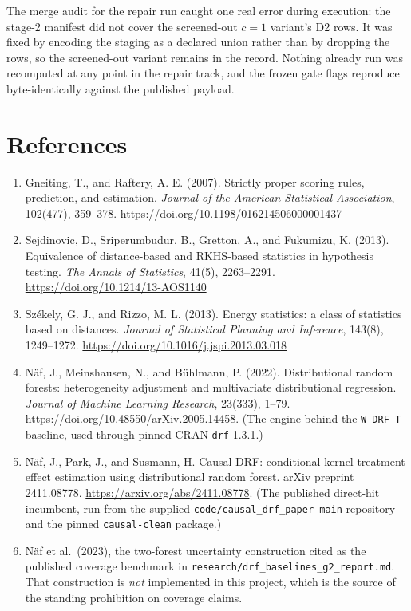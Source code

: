 \documentclass[11pt,a4paper]{article}
\theoremstyle{definition}
\theoremstyle{remark}
\begin{document}
The merge audit for the repair run caught one real error during execution: the
stage-2 manifest did not cover the screened-out $c=1$ variant's D2 rows. It was
fixed by encoding the staging as a declared union rather than by dropping the
rows, so the screened-out variant remains in the record. Nothing already run was
recomputed at any point in the repair track, and the frozen gate flags reproduce
byte-identically against the published payload.

\section*{References}

\begin{enumerate}
\item Gneiting, T., and Raftery, A. E. (2007). Strictly proper scoring rules,
prediction, and estimation. \emph{Journal of the American Statistical
Association}, 102(477), 359--378. \url{https://doi.org/10.1198/016214506000001437}
\item Sejdinovic, D., Sriperumbudur, B., Gretton, A., and Fukumizu, K. (2013).
Equivalence of distance-based and RKHS-based statistics in hypothesis testing.
\emph{The Annals of Statistics}, 41(5), 2263--2291.
\url{https://doi.org/10.1214/13-AOS1140}
\item Sz\'ekely, G. J., and Rizzo, M. L. (2013). Energy statistics: a class of
statistics based on distances. \emph{Journal of Statistical Planning and
Inference}, 143(8), 1249--1272. \url{https://doi.org/10.1016/j.jspi.2013.03.018}
\item N\"af, J., Meinshausen, N., and B\"uhlmann, P. (2022). Distributional
random forests: heterogeneity adjustment and multivariate distributional
regression. \emph{Journal of Machine Learning Research}, 23(333), 1--79.
\url{https://doi.org/10.48550/arXiv.2005.14458}. (The engine behind the
\texttt{W-DRF-T} baseline, used through pinned CRAN \texttt{drf} 1.3.1.)
\item N\"af, J., Park, J., and Susmann, H. Causal-DRF: conditional kernel
treatment effect estimation using distributional random forest. arXiv preprint
2411.08778. \url{https://arxiv.org/abs/2411.08778}. (The published direct-hit
incumbent, run from the supplied \texttt{code/causal\_drf\_paper-main}
repository and the pinned \texttt{causal-clean} package.)
\item N\"af et al.\ (2023), the two-forest uncertainty construction cited as the
published coverage benchmark in \texttt{research/drf\_baselines\_g2\_report.md}.
That construction is \emph{not} implemented in this project, which is the source
of the standing prohibition on coverage claims.
\end{enumerate}
\end{document}
